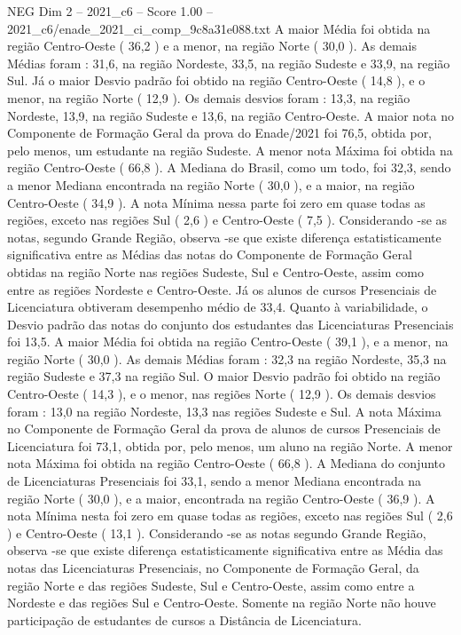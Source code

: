 \begin{textsample}{NEG Dim 2 – 2021\_c6 – Score 1.00 – 2021\_c6/enade\_2021\_ci\_comp\_9c8a31e088.txt}
A maior Média foi obtida na região Centro-Oeste ( 36,2 ) e a menor, na região Norte ( 30,0 ).
As demais Médias foram : 31,6, na região Nordeste, 33,5, na região Sudeste e 33,9, na região Sul.
Já o maior Desvio padrão foi obtido na região Centro-Oeste ( 14,8 ), e o menor, na região Norte ( 12,9 ).
Os demais desvios foram : 13,3, na região Nordeste, 13,9, na região Sudeste e 13,6, na região Centro-Oeste.
A maior nota no Componente de Formação Geral da prova do Enade/2021 foi 76,5, obtida por, pelo menos, um estudante na região Sudeste.
A menor nota Máxima foi obtida na região Centro-Oeste ( 66,8 ).
A Mediana do Brasil, como um todo, foi 32,3, sendo a menor Mediana encontrada na região Norte ( 30,0 ), e a maior, na região Centro-Oeste ( 34,9 ).
A nota Mínima nessa parte foi zero em quase todas as regiões, exceto nas regiões Sul ( 2,6 ) e Centro-Oeste ( 7,5 ).
Considerando -se as notas, segundo Grande Região, observa -se que existe diferença estatisticamente significativa entre as Médias das notas do Componente de Formação Geral obtidas na região Norte nas regiões Sudeste, Sul e Centro-Oeste, assim como entre as regiões Nordeste e Centro-Oeste.
Já os alunos de cursos Presenciais de Licenciatura obtiveram desempenho médio de 33,4.
Quanto à variabilidade, o Desvio padrão das notas do conjunto dos estudantes das Licenciaturas Presenciais foi 13,5.
A maior Média foi obtida na região Centro-Oeste ( 39,1 ), e a menor, na região Norte ( 30,0 ).
As demais Médias foram : 32,3 na região Nordeste, 35,3 na região Sudeste e 37,3 na região Sul.
O maior Desvio padrão foi obtido na região Centro-Oeste ( 14,3 ), e o menor, nas regiões Norte ( 12,9 ).
Os demais desvios foram : 13,0 na região Nordeste, 13,3 nas regiões Sudeste e Sul.
A nota Máxima no Componente de Formação Geral da prova de alunos de cursos Presenciais de Licenciatura foi 73,1, obtida por, pelo menos, um aluno na região Norte.
A menor nota Máxima foi obtida na região Centro-Oeste ( 66,8 ).
A Mediana do conjunto de Licenciaturas Presenciais foi 33,1, sendo a menor Mediana encontrada na região Norte ( 30,0 ), e a maior, encontrada na região Centro-Oeste ( 36,9 ).
A nota Mínima nesta foi zero em quase todas as regiões, exceto nas regiões Sul ( 2,6 ) e Centro-Oeste ( 13,1 ).
Considerando -se as notas segundo Grande Região, observa -se que existe diferença estatisticamente significativa entre as Média das notas das Licenciaturas Presenciais, no Componente de Formação Geral, da região Norte e das regiões Sudeste, Sul e Centro-Oeste, assim como entre a Nordeste e das regiões Sul e Centro-Oeste.
Somente na região Norte não houve participação de estudantes de cursos a Distância de Licenciatura.

\end{textsample}
